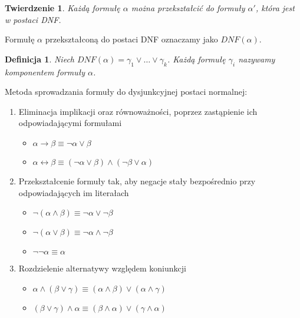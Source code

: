 \documentclass[11pt,a4paper]{article}
\newtheorem{defn}{Definicja}
\newtheorem{theorem}{Twierdzenie}
\begin{document}
\begin{theorem}
Każdą formułę $\alpha$ można przekształcić do formuły $\alpha'$, która jest w postaci DNF.
\end{theorem}

Formułę $\alpha$ przekształconą do postaci DNF oznaczamy jako $DNF(\alpha)$.

\begin{defn}
Niech $DNF(\alpha) = \gamma_1 \vee \dots \vee \gamma_k$. Każdą formułę $\gamma_i$ nazywamy komponentem formuły $\alpha$.
\end{defn}

Metoda sprowadzania formuły do dysjunkcyjnej postaci normalnej:

\begin{enumerate}
	\item Eliminacja implikacji oraz równoważności, poprzez zastąpienie ich 			odpowiadającymi formułami 
		\begin{itemize}
			\item $\alpha \rightarrow \beta \equiv \neg\alpha \vee \beta$
			\item $\alpha \leftrightarrow \beta \equiv (\neg\alpha \vee \beta) \wedge (\neg\beta \vee \alpha)$
		\end{itemize}
	\item Przekształcenie formuły tak, aby negacje stały bezpośrednio przy odpowiadających im literałach
		\begin{itemize}
			\item $\neg(\alpha \wedge \beta) \equiv \neg\alpha \vee \neg\beta$
			\item $\neg(\alpha \vee \beta) \equiv \neg\alpha \wedge \neg\beta$
			\item $\neg\neg\alpha \equiv \alpha$
		\end{itemize}
		\item Rozdzielenie alternatywy względem koniunkcji
		\begin{itemize}
			\item $\alpha \wedge (\beta \vee \gamma) \equiv (\alpha \wedge \beta) \vee (\alpha \wedge \gamma)$
			\item $(\beta \vee \gamma) \wedge \alpha \equiv (\beta \wedge \alpha) \vee (\gamma \wedge \alpha)$
		\end{itemize}
\end{enumerate}

\end{document}
